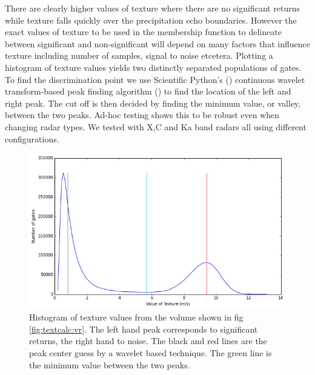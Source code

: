 \documentclass[twocol]{ametsoc}
\begin{document}
There are clearly higher values of texture where there are no significant returns while texture falls 
quickly over the precipitation echo boundaries. However the exact values of texture to be used 
in the membership function to delineate between significant and non-significant will depend on 
many factors that influence texture including number of samples, signal to noise etcetera.
 Plotting a histogram of texture values yields  two distinctly separated populations of gates. 
 To find the discrimination point we use Scientific Python's (\cite{scipy}) continuous wavelet transform-based
 peak finding algorithm (\cite{Du01092006}) to find the location of the left and right peak. The cut off is then
 decided by finding the minimum value, or valley, between the two peaks. Ad-hoc testing shows this to be robust
 even when changing radar types. We tested with X,C and Ka band radars all using different configurations. 
 

\begin{figure}[h]
    \centering
    \includegraphics[width=0.95\columnwidth]{peak_finding.png}
    \caption{Histogram of texture values from the volume shown in fig \ref{fig:textcalc:vr}. The left hand peak corresponds to 
    significant returns, the right hand to noise. The black and red lines are the peak center guess by a wavelet based technique. 
    The green line is the minimum value between the two peaks. }
    \label{fig:grid}
\end{figure}
\end{document}

